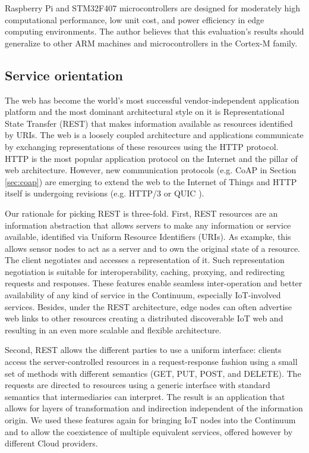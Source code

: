 Raspberry Pi and STM32F407 microcontrollers are designed for moderately high computational performance, low unit cost, and power efficiency in edge computing environments. The author believes that this evaluation's results should generalize to other ARM machines and microcontrollers in the Cortex-M family.

\subsection{Service orientation}

The web has become the world's most successful vendor-independent application platform and the most dominant architectural style on it is Representational State Transfer (REST) \cite{rest} that makes information available as resources identified by URIs. The web is a loosely coupled architecture and applications communicate by exchanging representations of these resources using the HTTP protocol. HTTP is the most popular application protocol on the Internet and the pillar of web architecture. However, new communication protocols (e.g. CoAP in Section \ref{sec:coap}) are emerging to extend the web to the Internet of Things and HTTP itself is undergoing revisions (e.g. HTTP/3 or QUIC \cite{langley2017quic}).

Our rationale for picking REST is three-fold. First, REST resources are an information abstraction that allows servers to make any information or service available, identified via Uniform Resource Identifiers (URIs). As exampke, this allows sensor nodes to act as a server and to own the original state of a resource. The client negotiates and accesses a representation of it. Such representation negotiation is suitable for interoperability, caching, proxying, and redirecting requests and responses. These features enable seamless inter-operation and better availability of any kind of service in the Continuum, especially IoT-involved services. Besides, under the REST architecture, edge nodes can often advertise web links to other resources creating a distributed discoverable IoT web and resulting in an even more scalable and flexible architecture.

Second, REST allows the different parties to use a uniform interface: clients access the server-controlled resources in a request-response fashion using a small set of methods with different semantics (GET, PUT, POST, and DELETE). The requests are directed to resources using a generic interface with standard semantics that intermediaries can interpret. The result is an application that allows for layers of transformation and indirection independent of the information origin. We used these features again for bringing IoT nodes into the Continuum and to allow the coexistence of multiple equivalent services, offered however by different Cloud providers.

